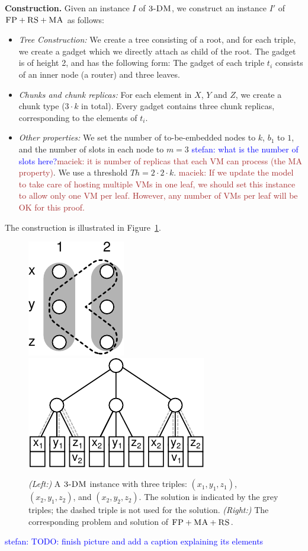 \documentclass[9pt]{sigcomm-alternate}
\newcommand{\maciek}[1]{\textcolor{brown}{maciek: #1}}
\newcommand{\stefan}[1]{\textcolor{blue}{stefan: #1}}
\newcommand{\FP}{\textsc{FP}}
\newcommand{\RS}{\textsc{RS}}
\newcommand{\MA}{\textsc{MA}}
\newcommand{\CostTrans}{\ensuremath{b_1}}
\newcommand{\TDM}{\textsc{3-DM}}
\newcommand{\Thr}{\ensuremath{Th}}
\begin{document}
\textbf{Construction.}
Given an instance $I$ of $\TDM$, we construct an instance $I'$ of
$\FP+\RS+\MA$ as follows:
\begin{itemize}
\item \emph{Tree Construction:} We create a tree consisting of a root,
and for each triple, we create a gadget which we directly attach as
child of the root. The gadget is of height 2,
and has the following form:
The gadget of each triple $t_i$ consists of an inner node (a router) and three leaves.
\item \emph{Chunks and chunk replicas:} For each element in $X$, $Y$ and $Z$,
 we create a chunk type
($3 \cdot k$ in total). Every gadget
contains three chunk replicas, corresponding to the elements of $t_i$.
\item \emph{Other properties:} We set the number of to-be-embedded nodes to $k$,
$\CostTrans$ to $1$, and the number of slots in each node to $m=3$ \stefan{what
is the number of slots here?}\maciek{it is number of replicas that
each VM can process (the MA property)}. We use a threshold $\Thr=2 \cdot 2
\cdot k$. \maciek{If we update the model to take care of hosting
  multiple VMs in one leaf, we should set this instance to allow only
  one VM per leaf. However, any number of VMs per leaf will be OK for
  this proof.}
\end{itemize}

The construction is illustrated in Figure~\ref{fig:fprsma}.
\begin{figure}[htbp]
\includegraphics[width = 0.3\columnwidth]{figs/np_3dm_formular}
\hfill
\includegraphics[width = 0.6\columnwidth]{figs/np_3dm_construction}
\caption{\textit{(Left:)} A $\TDM$ instance with three triples:
$(x_1, y_1, z_1)$, $(x_2, y_1, z_2)$, and $(x_2, y_2, z_2)$. The solution is
indicated by the grey triples; the dashed triple is not used for the
solution. \textit{(Right:)} The corresponding problem and solution of $\FP + \MA
+ \RS$.}
\label{fig:fprsma}
\end{figure}
\stefan{TODO: finish picture and add a caption explaining its
elements}
\end{document}
